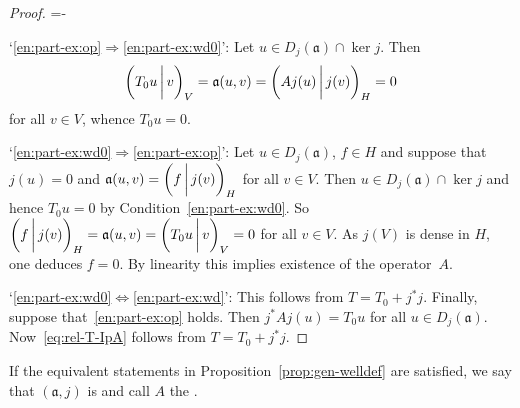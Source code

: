 \documentclass[a4paper,oneside,12pt]{amsart}
\makeatletter
\theoremstyle{plain}
\theoremstyle{definition}
\newenvironment{parenum}[1][]{\my@savedparindent=\parindent\ifthenelse{\equal{#1}{}}{\asparaenum}{\asparaenum[#1]}\advance\itemindent-\my@savedparindent
\patchcmd{\@item}{\ignorespaces}{{\itemindent={\the\itemindent}
\def{}}\ignorespaces}{}{}}
{\endasparaenum}
\makeatother
\begin{document}
\begin{proof}
\begin{parenum}
\item[`\ref{en:part-ex:op}$\Rightarrow$\ref{en:part-ex:wd0}':] 
Let $u\in D_j({{\mathfrak{{a}}}})\cap\ker j$. Then
\[
    {{\ifthenelse{\equal{auto}{auto}}{\left({T_0u}\mkern3mu{\biggm|}\mkern3mu {v}\right)}{}
\ifthenelse{\equal{auto}{b}}{\bigl({T_0u}\mkern3mu{\biggm|}\mkern3mu {v}\bigr)}{}
\ifthenelse{\equal{auto}{B}}{\Bigl({T_0u}\mkern3mu{\bigm|}\mkern3mu {v}\Bigr)}{}
}}_V={{\mathfrak{{a}}}}(u,v)={{\ifthenelse{\equal{auto}{auto}}{\left({Aj(u)}\mkern3mu{\biggm|}\mkern3mu {j(v)}\right)}{}
\ifthenelse{\equal{auto}{b}}{\bigl({Aj(u)}\mkern3mu{\biggm|}\mkern3mu {j(v)}\bigr)}{}
\ifthenelse{\equal{auto}{B}}{\Bigl({Aj(u)}\mkern3mu{\bigm|}\mkern3mu {j(v)}\Bigr)}{}
}}_H=0
\]
for all $v\in V$, whence $T_0u=0$.

\item[`\ref{en:part-ex:wd0}$\Rightarrow$\ref{en:part-ex:op}':]
Let $u\in D_j({{\mathfrak{{a}}}})$, $f\in H$ and suppose that $j(u)=0$ and
${{\mathfrak{{a}}}}(u,v) = {{\ifthenelse{\equal{auto}{auto}}{\left({f}\mkern3mu{\biggm|}\mkern3mu {j(v)}\right)}{}
\ifthenelse{\equal{auto}{b}}{\bigl({f}\mkern3mu{\biggm|}\mkern3mu {j(v)}\bigr)}{}
\ifthenelse{\equal{auto}{B}}{\Bigl({f}\mkern3mu{\bigm|}\mkern3mu {j(v)}\Bigr)}{}
}}_H$ for all $v\in V$. Then $u\in D_j({{\mathfrak{{a}}}})\cap\ker j$
and hence $T_0u=0$ by Condition~\ref{en:part-ex:wd0}. So ${{\ifthenelse{\equal{auto}{auto}}{\left({f}\mkern3mu{\biggm|}\mkern3mu {j(v)}\right)}{}
\ifthenelse{\equal{auto}{b}}{\bigl({f}\mkern3mu{\biggm|}\mkern3mu {j(v)}\bigr)}{}
\ifthenelse{\equal{auto}{B}}{\Bigl({f}\mkern3mu{\bigm|}\mkern3mu {j(v)}\Bigr)}{}
}}_H =
{{\mathfrak{{a}}}}(u,v) = {{\ifthenelse{\equal{auto}{auto}}{\left({T_0u}\mkern3mu{\biggm|}\mkern3mu {v}\right)}{}
\ifthenelse{\equal{auto}{b}}{\bigl({T_0u}\mkern3mu{\biggm|}\mkern3mu {v}\bigr)}{}
\ifthenelse{\equal{auto}{B}}{\Bigl({T_0u}\mkern3mu{\bigm|}\mkern3mu {v}\Bigr)}{}
}}_V = 0$ for all $v\in V$. As $j(V)$ is dense
in $H$, one deduces $f=0$. By linearity this implies existence of
the operator~$A$.

\item[`\ref{en:part-ex:wd0}$\Leftrightarrow$\ref{en:part-ex:wd}':] 
This follows from $T=T_0+j^*j$.
\end{parenum}
Finally, suppose that~\ref{en:part-ex:op} holds. Then $j^*Aj(u)=T_0u$ for all $u\in D_j({{\mathfrak{{a}}}})$.
Now~\eqref{eq:rel-T-IpA} follows from $T=T_0+j^*j$.
\end{proof}
If the equivalent statements in Proposition~\ref{prop:gen-welldef} are satisfied,
we say that $({{\mathfrak{{a}}}},j)$ is {\textbf{\unboldmath}}
and call $A$ the {\textbf{\unboldmath}}.
\end{document}
